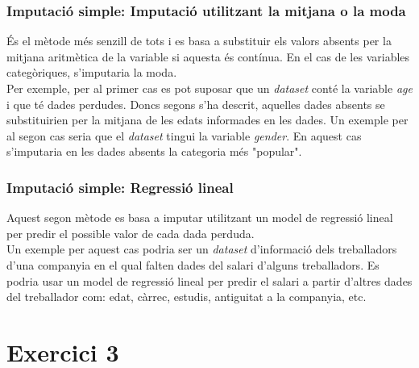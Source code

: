 \documentclass[a4paper,12pt]{report}
\begin{document}
\subsubsection*{Imputació simple: Imputació utilitzant la mitjana o la moda}
És el mètode més senzill de tots i es basa a substituir els valors absents per la mitjana aritmètica de la variable si aquesta és contínua. En el cas de les variables categòriques, s'imputaria la moda.\\
Per exemple, per al primer cas es pot suposar que un \textit{dataset} conté la variable \textit{age} i que té dades perdudes. Doncs segons s'ha descrit, aquelles dades absents se substituirien per la mitjana de les edats informades en les dades. Un exemple per al segon cas seria que el \textit{dataset} tingui la variable \textit{gender}. En aquest cas s'imputaria en les dades absents la categoria més "popular".
\subsubsection*{Imputació simple: Regressió lineal}
Aquest segon mètode es basa a imputar utilitzant un model de regressió lineal per predir el possible valor de cada dada perduda.\\
Un exemple per aquest cas podria ser un \textit{dataset} d'informació dels treballadors d'una companyia en el qual falten dades del salari d'alguns treballadors. Es podria usar un model de regressió lineal per predir el salari a partir d'altres dades del treballador com: edat, càrrec, estudis, antiguitat a la companyia, etc.
\section*{Exercici 3}
\end{document}
